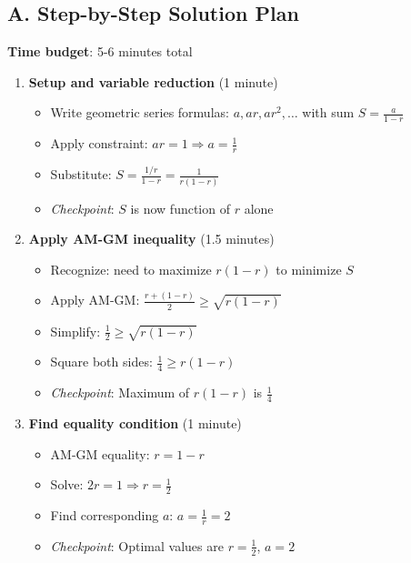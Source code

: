 \documentclass[12pt]{article}
\begin{document}
\begin{roadmapbox}
\subsection*{A. Step-by-Step Solution Plan}

\textbf{Time budget}: 5-6 minutes total

\begin{enumerate}[leftmargin=*]
    \item \textbf{Setup and variable reduction} (1 minute)
    \begin{itemize}
        \item Write geometric series formulas: $a, ar, ar^2, \ldots$ with sum $S = \frac{a}{1-r}$
        \item Apply constraint: $ar = 1 \Rightarrow a = \frac{1}{r}$
        \item Substitute: $S = \frac{1/r}{1-r} = \frac{1}{r(1-r)}$
        \item \textit{Checkpoint}: $S$ is now function of $r$ alone
    \end{itemize}
    
    \item \textbf{Apply AM-GM inequality} (1.5 minutes)
    \begin{itemize}
        \item Recognize: need to maximize $r(1-r)$ to minimize $S$
        \item Apply AM-GM: $\frac{r + (1-r)}{2} \geq \sqrt{r(1-r)}$
        \item Simplify: $\frac{1}{2} \geq \sqrt{r(1-r)}$
        \item Square both sides: $\frac{1}{4} \geq r(1-r)$
        \item \textit{Checkpoint}: Maximum of $r(1-r)$ is $\frac{1}{4}$
    \end{itemize}
    
    \item \textbf{Find equality condition} (1 minute)
    \begin{itemize}
        \item AM-GM equality: $r = 1-r$
        \item Solve: $2r = 1 \Rightarrow r = \frac{1}{2}$
        \item Find corresponding $a$: $a = \frac{1}{r} = 2$
        \item \textit{Checkpoint}: Optimal values are $r = \frac{1}{2}$, $a = 2$
    \end{itemize}
    

\end{enumerate}
\end{roadmapbox}
\end{document}
